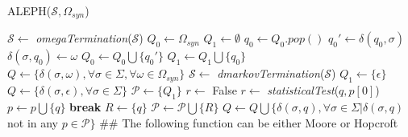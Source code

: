 {%
%
\begin{algorithm}
  \caption{ALEPH($\mathcal{S}, \Omega_{syn}$)\label{alg:aleph}}
    \begin{algorithmic}[1]
      \Procedure{}{}
      		\State $\mathcal{S} \gets$ \textit{omegaTermination}($\mathcal{S}$)
	      	\State $Q_0 \gets \Omega_{syn}$
	      	\State $Q_1 \gets \emptyset$
	      		\State $q_0 \gets Q_0.pop()$
	      		\For{$\sigma \in \Sigma$}
	      			\State $q_0' \gets \delta(q_0,\sigma)$
	      				\State $\delta(\sigma,q_0) \gets \omega$
	      			\Else
	      					\State $Q_0 \gets Q_0\bigcup\{q_0'\}$
	      				\EndIf 
	      			\EndIf
	      			\State $Q_1 \gets Q_1\bigcup\{q_0\}$
	      		\EndFor
	      	\EndWhile	      	
      		\State $Q \gets \{\delta(\sigma,\omega), \forall \sigma \in \Sigma, \forall \omega \in \Omega_{syn}\}$
      	\Else
      		\State $\mathcal{S} \gets$ \textit{dmarkovTermination}($\mathcal{S}$)
      		\State $Q_1 \gets \{\epsilon\}$
      		\State $Q \gets \{\delta(\sigma,\epsilon), \forall \sigma \in \Sigma\}$
      	\EndIf
      	\State $\mathcal{P} \gets \{Q_1\}$
      		\State $r \gets$ False
      			\State $r \gets$ \textit{statisticalTest}($q, p[0]$)
      				\State $p \gets p\bigcup\{q\}$
      				\State \textbf{break}
      			\EndIf
      		\EndFor
      			\State $R \gets \{q\}$
      			\State $\mathcal{P} \gets \mathcal{P}\bigcup\{R\}$
      		\EndIf 
      		\State $Q \gets Q\bigcup\{\delta(\sigma,q),\forall \sigma\in\Sigma|\delta(\sigma,q)$ not in any $p\in\mathcal{P}\}$
      	\EndFor
      	\State \#\# The following function can be either Moore or Hopcroft

\end{algorithmic}
\end{algorithm}}
